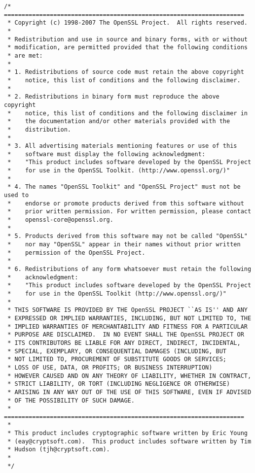 \begin{lstlisting}[firstnumber=1,]
/* ====================================================================
 * Copyright (c) 1998-2007 The OpenSSL Project.  All rights reserved.
 *
 * Redistribution and use in source and binary forms, with or without
 * modification, are permitted provided that the following conditions
 * are met:
 *
 * 1. Redistributions of source code must retain the above copyright
 *    notice, this list of conditions and the following disclaimer.
 *
 * 2. Redistributions in binary form must reproduce the above copyright
 *    notice, this list of conditions and the following disclaimer in
 *    the documentation and/or other materials provided with the
 *    distribution.
 *
 * 3. All advertising materials mentioning features or use of this
 *    software must display the following acknowledgment:
 *    "This product includes software developed by the OpenSSL Project
 *    for use in the OpenSSL Toolkit. (http://www.openssl.org/)"
 *
 * 4. The names "OpenSSL Toolkit" and "OpenSSL Project" must not be used to
 *    endorse or promote products derived from this software without
 *    prior written permission. For written permission, please contact
 *    openssl-core@openssl.org.
 *
 * 5. Products derived from this software may not be called "OpenSSL"
 *    nor may "OpenSSL" appear in their names without prior written
 *    permission of the OpenSSL Project.
 *
 * 6. Redistributions of any form whatsoever must retain the following
 *    acknowledgment:
 *    "This product includes software developed by the OpenSSL Project
 *    for use in the OpenSSL Toolkit (http://www.openssl.org/)"
 *
 * THIS SOFTWARE IS PROVIDED BY THE OpenSSL PROJECT ``AS IS'' AND ANY
 * EXPRESSED OR IMPLIED WARRANTIES, INCLUDING, BUT NOT LIMITED TO, THE
 * IMPLIED WARRANTIES OF MERCHANTABILITY AND FITNESS FOR A PARTICULAR
 * PURPOSE ARE DISCLAIMED.  IN NO EVENT SHALL THE OpenSSL PROJECT OR
 * ITS CONTRIBUTORS BE LIABLE FOR ANY DIRECT, INDIRECT, INCIDENTAL,
 * SPECIAL, EXEMPLARY, OR CONSEQUENTIAL DAMAGES (INCLUDING, BUT
 * NOT LIMITED TO, PROCUREMENT OF SUBSTITUTE GOODS OR SERVICES;
 * LOSS OF USE, DATA, OR PROFITS; OR BUSINESS INTERRUPTION)
 * HOWEVER CAUSED AND ON ANY THEORY OF LIABILITY, WHETHER IN CONTRACT,
 * STRICT LIABILITY, OR TORT (INCLUDING NEGLIGENCE OR OTHERWISE)
 * ARISING IN ANY WAY OUT OF THE USE OF THIS SOFTWARE, EVEN IF ADVISED
 * OF THE POSSIBILITY OF SUCH DAMAGE.
 * ====================================================================
 *
 * This product includes cryptographic software written by Eric Young
 * (eay@cryptsoft.com).  This product includes software written by Tim
 * Hudson (tjh@cryptsoft.com).
 *
 */


\end{lstlisting}
